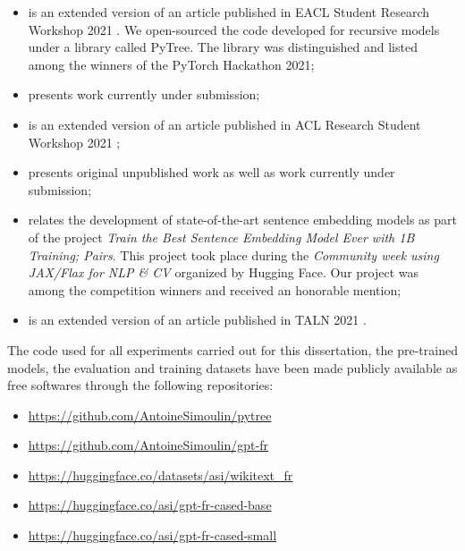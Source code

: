 \begin{itemize}
    \item {} is an extended version of an article published in EACL Student Research Workshop 2021 \parencite{simoulin_2021a}. We  open-sourced the code developed for recursive models under a library called PyTree. The library was distinguished and listed among the winners of the PyTorch Hackathon 2021;
    \item {} presents work currently under submission;
    \item {} is an extended version of an article published in ACL Research Student Workshop 2021 \parencite{simoulin_2021b};
    \item {} presents original unpublished work as well as work currently under submission;
    \item {} relates the development of state-of-the-art sentence embedding models as part of the project \textit{Train the Best Sentence Embedding Model Ever with 1B Training; Pairs}. This project took place during the \textit{Community week using JAX/Flax for NLP \& CV} organized by Hugging Face. Our project was among the competition winners and received an honorable mention;
    \item {} is an extended version of an article published in TALN 2021 \parencite{simoulin_2021c}.
\end{itemize}


The code used for all experiments carried out for this dissertation, the pre-trained models, the evaluation and training datasets have been made publicly available as free softwares through the following repositories:

\begin{itemize}
    \item \url{https://github.com/AntoineSimoulin/pytree}
    \item \url{https://github.com/AntoineSimoulin/gpt-fr}
    \item \url{https://huggingface.co/datasets/asi/wikitext_fr}
    \item \url{https://huggingface.co/asi/gpt-fr-cased-base}
    \item \url{https://huggingface.co/asi/gpt-fr-cased-small}
\end{itemize}
